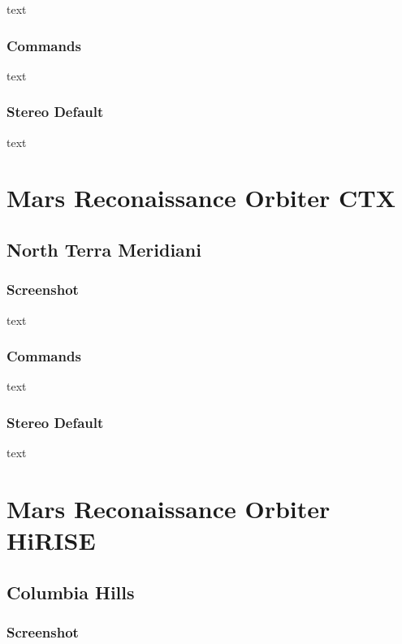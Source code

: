 text

\subsubsection*{Commands}

text

\subsubsection*{Stereo Default}

text

\section{Mars Reconaissance Orbiter CTX}

\subsection{North Terra Meridiani}

\subsubsection*{Screenshot}

text

\subsubsection*{Commands}

text

\subsubsection*{Stereo Default}

text

\section{Mars Reconaissance Orbiter HiRISE}

\subsection{Columbia Hills}

\subsubsection*{Screenshot}

